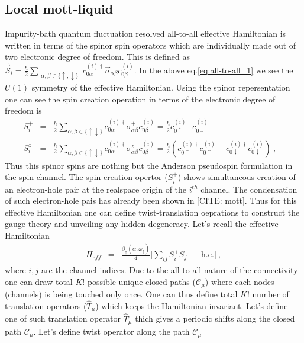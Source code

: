 \documentclass[reprint,prb,superscriptaddress]{revtex4-1}
\begin{document}
\subsection{Local mott-liquid}
Impurity-bath quantum fluctuation resolved all-to-all effective Hamiltonian is written in terms of the spinor spin operators which are individually made out of two electronic degree of freedom. This is defined as $\vec{S}_i=\frac{\hbar}{2} \displaystyle\sum_{\substack{ \alpha,\beta\in \{\uparrow,\downarrow\}}}  c_{0\alpha}^{(i)\dagger} \vec{\sigma}_{\alpha\beta} c_{0\beta}^{(i)}$. In the above eq.\eqref{eq:all-to-all_1} we see the $U(1)$ symmetry of the effective Hamiltonian. Using the spinor repersentation one can see the spin creation operation in terms of the electronic degree of freedom is 
\begin{eqnarray}
S_i^+ &=& \frac{\hbar}{2} \displaystyle\sum_{\alpha,\beta\in \{\uparrow\downarrow\}} c_{0\alpha}^{(i)\dagger} {\sigma}^{+}_{\alpha\beta} c_{0\beta}^{(i)}
=\frac{\hbar}{2} c_{0\uparrow}^{(i)\dagger} c_{0\downarrow}^{(i)}  \\
S_i^z &=& \frac{\hbar}{2} \displaystyle\sum_{\alpha,\beta\in \{\uparrow\downarrow\}} c_{0\alpha}^{(i)\dagger} {\sigma}^{z}_{\alpha\beta} c_{0\beta}^{(i)} =\frac{\hbar}{2} (c_{0\uparrow}^{(i)\dagger} c_{0\uparrow}^{(i)} - c_{0\downarrow}^{(i)\dagger} c_{0\downarrow}^{(i)} )~,~~~~
\end{eqnarray}
Thus this spinor spins are nothing but the Anderson pseudospin formulation in the spin channel. The spin creation opertor ($S_i^+$) shows simultaneous creation of an electron-hole pair at the realspace origin of the $i^{th}$ channel. The condensation of such electron-hole pais has already been shown in [CITE: mott]. Thus for this effective Hamiltonian one can define twist-translation oeprations to construct the gauge theory and unveiling any hidden degeneracy. Let's recall the effective Hamiltonian
\begin{eqnarray}
H_{eff} &=& \frac{\beta_{\uparrow}(\alpha,\omega_{\uparrow})}{4} \bigg[ \displaystyle\sum_{ij} S_i^+S_j^- ~+ \textrm{h.c.} \bigg]~,
\end{eqnarray}
where $i,j$ are the channel indices. Due to the all-to-all nature of the connectivity one can draw total $K!$ possible unique closed paths ($\mathcal{C}_{\mu}$) where each nodes (channels) is being touched only once. One can thus define total $K!$ number of translation operators ($\hat{T}_{\mu}$) which keeps the Hamiltonian invariant. Let's define one of such translation operator $\hat{T}_{\mu}$ thich gives a periodic shifts along the closed path $\mathcal{C}_{\mu}$. Let's define twist operator along the path $\mathcal{C}_{\mu}$
\end{document}
